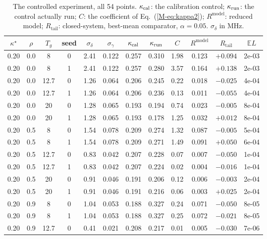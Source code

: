 \documentclass[aps,pra,onecolumn,notitlepage,superscriptaddress,nofootinbib,floatfix]{revtex4-2}
\newcommand{\E}{\mathbb{E}}
\newcommand{\Rt}{R_{\mathrm{tail}}}
\newcommand{\Rm}{R^{\mathrm{model}}}
\begin{document}
\begin{table}[htbp]
\centering\scriptsize\setlength{\tabcolsep}{3.5pt}
\caption{The controlled experiment, all 54 points. $\kappa_{\rm cal}$: the
calibration control; $\kappa_{\rm run}$: the control actually run; $C$: the
coefficient of Eq.~(\ref{M-eq:kappa2}); $\Rm$: reduced model; $\Rt$:
closed-system, best-mean comparator, $\alpha=0.05$. $\sigma_\delta$ in MHz.}
\label{tab:stage3A}
\begin{tabular}{@{}cccccccccccc@{}}
\toprule
$\kappa^\star$ & $\rho$ & $T_g$ & seed & $\sigma_\delta$ & $\sigma_\gamma$ &
$\kappa_{\rm cal}$ & $\kappa_{\rm run}$ & $C$ & $\Rm$ & $\Rt$ & $\E L$\\
\midrule
0.20 & 0.0 & 8 & 0 & 2.41 & 0.122 & 0.257 & 0.310 & 1.98 & 0.123 & $+0.094$ & 2e-03 \\
0.20 & 0.0 & 8 & 1 & 2.41 & 0.122 & 0.257 & 0.280 & 3.57 & 0.164 & $+0.138$ & 2e-03 \\
0.20 & 0.0 & 12.7 & 0 & 1.26 & 0.064 & 0.206 & 0.245 & 0.22 & 0.018 & $-0.025$ & 4e-04 \\
0.20 & 0.0 & 12.7 & 1 & 1.26 & 0.064 & 0.206 & 0.236 & 0.13 & 0.011 & $-0.055$ & 4e-04 \\
0.20 & 0.0 & 20 & 0 & 1.28 & 0.065 & 0.193 & 0.194 & 0.74 & 0.023 & $-0.005$ & 8e-04 \\
0.20 & 0.0 & 20 & 1 & 1.28 & 0.065 & 0.193 & 0.178 & 1.25 & 0.032 & $+0.012$ & 8e-04 \\
0.20 & 0.5 & 8 & 0 & 1.54 & 0.078 & 0.209 & 0.274 & 1.32 & 0.087 & $-0.005$ & 5e-04 \\
0.20 & 0.5 & 8 & 1 & 1.54 & 0.078 & 0.209 & 0.271 & 1.49 & 0.091 & $+0.050$ & 6e-04 \\
0.20 & 0.5 & 12.7 & 0 & 0.83 & 0.042 & 0.207 & 0.228 & 0.07 & 0.007 & $-0.050$ & 1e-04 \\
0.20 & 0.5 & 12.7 & 1 & 0.83 & 0.042 & 0.207 & 0.224 & 0.02 & 0.004 & $-0.016$ & 1e-04 \\
0.20 & 0.5 & 20 & 0 & 0.91 & 0.046 & 0.191 & 0.206 & 0.12 & 0.006 & $-0.003$ & 2e-04 \\
0.20 & 0.5 & 20 & 1 & 0.91 & 0.046 & 0.191 & 0.216 & 0.06 & 0.003 & $+0.025$ & 2e-04 \\
0.20 & 0.9 & 8 & 0 & 1.04 & 0.053 & 0.188 & 0.327 & 0.24 & 0.071 & $-0.050$ & 8e-05 \\
0.20 & 0.9 & 8 & 1 & 1.04 & 0.053 & 0.188 & 0.327 & 0.25 & 0.072 & $-0.021$ & 8e-05 \\
0.20 & 0.9 & 12.7 & 0 & 0.41 & 0.021 & 0.208 & 0.217 & 0.01 & 0.005 & $-0.030$ & 7e-06 \\

\end{tabular}
\end{table}
\end{document}

